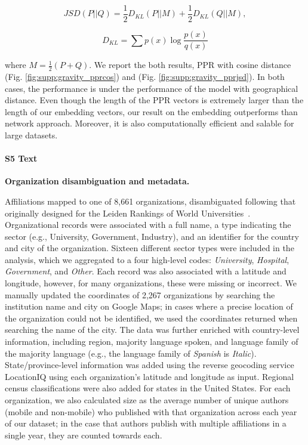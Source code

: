\documentclass[12pt]{article} %
\begin{document}
\begin{equation}
	\label{eq:JSD}
	JSD(P||Q) = \frac{1}{2}D_{KL}(P||M) + \frac{1}{2}D_{KL}(Q||M),
\end{equation}

\begin{equation}
	\label{eq:KL}
	D_{KL} = \sum p(x)\log\frac{p(x)}{q(x)}
\end{equation}

where $M=\frac{1}{2}(P+Q)$. We report the both results, PPR with cosine distance (Fig. \ref{fig:supp:gravity_pprcos}) and (Fig. \ref{fig:supp:gravity_pprjsd}). In both cases, the performance is under the performance of the model with geographical distance. Even though the length of the PPR vectors is extremely larger than the length of our embedding vectors, our result on the embedding outperforms than network approach. Moreover, it is also computationally efficient and salable for large datasets.



%
\paragraph*{S5 Text}
\label{si:text:organizations}
{\bf Organization disambiguation and metadata.}

Affiliations mapped to one of 8,661 organizations, disambiguated following that originally designed for the Leiden Rankings of World Universities~\autocite{waltman2012leidenrankings}.
Organizational records were associated with a full name, a type indicating the sector (e.g., University, Government, Industry), and an identifier for the country and city of the organization.
Sixteen different sector types were included in the analysis, which we aggregated to a four high-level codes: \textit{University}, \textit{Hospital}, \textit{Government}, and \textit{Other}.
Each record was also associated with a latitude and longitude, however, for many organizations, these were missing or incorrect. We manually updated the coordinates of 2,267 organizations by searching the institution name and city on Google Maps;
in cases where a precise location of the organization could not be identified, we used the coordinates returned when searching the name of the city.
The data was further enriched with country-level information, including region, majority language spoken, and language family of the majority language (e.g., the language family of \textit{Spanish} is \textit{Italic}).
State/province-level information was added using the reverse geocoding service LocationIQ using each organization's latitude and longitude as input.
Regional census classifications were also added for states in the United States.
For each organization, we also calculated size as the average number of unique authors (mobile and non-mobile) who published with that organization across each year of our dataset;
in the case that authors publish with multiple affiliations in a single year, they are counted towards each.
\end{document}
